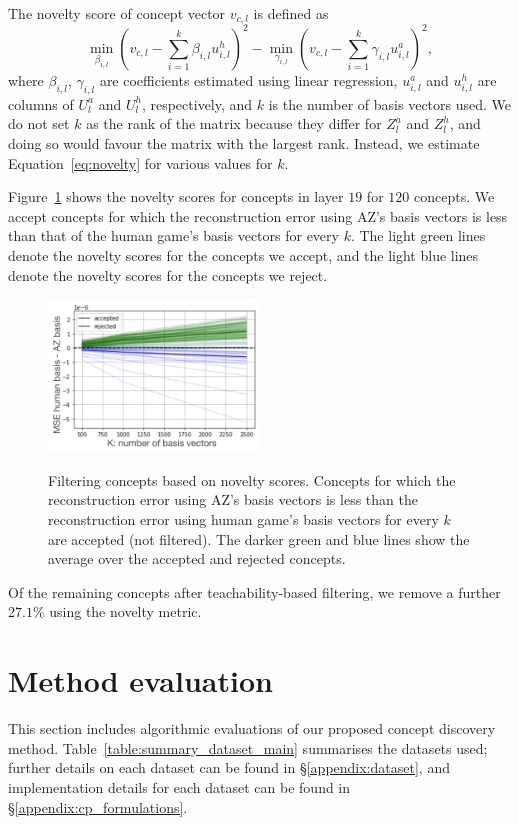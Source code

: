 \documentclass{article}
\def\vcl{v_{c,l}}
\begin{document}
The novelty score of concept vector $\vcl$ is defined as
\begin{equation} \label{eq:novelty}
\min_{\beta_{i,l}} \left(\vcl - \sum_{i=1}^k \beta_{i,l} u^h_{i,l}\right)^2 - \min_{\gamma_{i,l}} \left(\vcl - \sum_{i=1}^k \gamma_{i,l} u^a_{i,l} \right)^2,
\end{equation}
where $\beta_{i,l}$, $\gamma_{i,l}$ are coefficients estimated using linear regression, $u_{i,l}^{a}$ and $u_{i,l}^{h}$ are columns of $U_l^{a}$ and $U_l^{h}$, respectively, and $k$ is the number of basis vectors used. 
We do not set $k$ as the rank of the matrix because they differ for $Z_l^a$ and $Z_l^h$, and doing so would favour the matrix with the largest rank. Instead, we estimate Equation~\ref{eq:novelty} for various values for $k$.

Figure~\ref{fig:novelty_score} shows the novelty scores for concepts in layer $19$ for $120$ concepts. We accept concepts for which the reconstruction error using AZ's basis vectors is less than that of the human game's basis vectors for every $k$.
The light green lines denote the novelty scores for the concepts we accept, and the light blue lines denote the novelty scores for the concepts we reject. 

\begin{figure}[!ht]
\caption{Filtering concepts based on novelty scores. Concepts for which the reconstruction error using AZ's basis vectors is less than the reconstruction error using human game's basis vectors for every $k$ are accepted (not filtered). The darker green and blue lines show the average over the accepted and rejected concepts.}
\centering
\includegraphics[width=0.5\textwidth]{novelty2.png}
\label{fig:novelty_score}
\end{figure}
\FloatBarrier

Of the remaining concepts after teachability-based filtering, we remove a further $27.1 \%$ using the novelty metric. 

\section{Method evaluation} \label{sec:method_eval}
This section includes algorithmic evaluations of our proposed concept discovery method. Table~\ref{table:summary_dataset_main} summarises the datasets used; further details on each dataset can be found in \S\ref{appendix:dataset}, and implementation details for each dataset can be found in \S\ref{appendix:cp_formulations}. 
\end{document}
